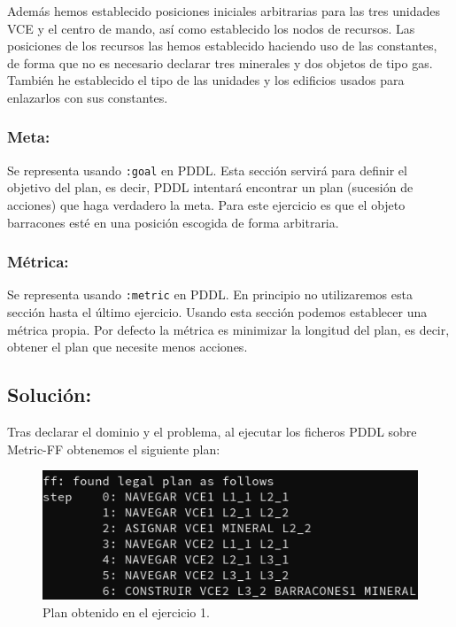 \documentclass[11pt, spanish]{article}
\begin{document}
Además hemos establecido posiciones iniciales arbitrarias para las tres unidades VCE y el centro de mando, así como establecido los nodos de recursos. Las posiciones de los recursos las hemos establecido haciendo uso de las constantes, de forma que no es necesario declarar tres minerales y dos objetos de tipo gas. También he establecido el tipo de las unidades y los edificios usados para enlazarlos con sus constantes.

\subsubsection{Meta:}

Se representa usando \texttt{:goal} en PDDL. Esta sección servirá para definir el objetivo del plan, es decir, PDDL intentará encontrar un plan (sucesión de acciones) que haga verdadero la meta. Para este ejercicio es que el objeto barracones esté en una posición escogida de forma arbitraria.

\subsubsection{Métrica:}

Se representa usando \texttt{:metric} en PDDL. En principio no utilizaremos esta sección hasta el último ejercicio. Usando esta sección podemos establecer una métrica propia. Por defecto la métrica es minimizar la longitud del plan, es decir, obtener el plan que necesite menos acciones.


\subsection{Solución:}

Tras declarar el dominio y el problema, al ejecutar los ficheros PDDL sobre Metric-FF obtenemos el siguiente plan:

\begin{figure}[H]
	\centering
	\includegraphics[scale=0.4]{plan1.png}
	\caption{Plan obtenido en el ejercicio 1.}
	\label{plan1}
\end{figure}
\end{document}
